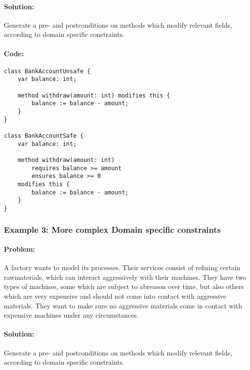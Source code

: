 \paragraph{Solution:}
Generate a pre- and postconditions on methods which modify relevant fields, according to domain specific constraints.

\paragraph{Code:}
\begin{lstlisting}[language=dafny]
class BankAccountUnsafe {
	var balance: int;
	
	method withdraw(amount: int) modifies this {
		balance := balance - amount;
	}
}

class BankAccountSafe {
	var balance: int;
	
	method withdraw(amount: int) 
		requires balance >= amount  
		ensures balance >= 0  
	modifies this {
		balance := balance - amount;
	}
}
\end{lstlisting}


\subsubsection{Example 3: More complex Domain specific constraints} \label{Example 3}
\paragraph{Problem:}
A factory wants to model its processes. Their services consist of refining certain rawmaterials, which can interact aggressively with their machines. They have two types of machines, some which are subject to abreason over time, but also others which are very expensive and should not come into contact with aggressive materials. They want to make sure no aggressive materials come in contact with expensive machines under any circumstances.
\paragraph{Solution:}
Generate a pre- and postconditions on methods which modify relevant fields, according to domain specific constraints.

